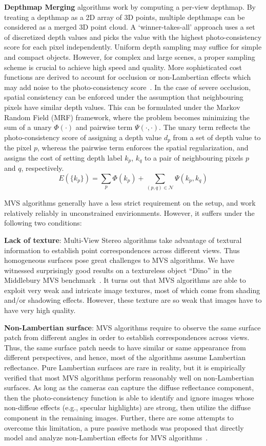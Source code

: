 \textbf{Depthmap Merging} algorithms work by computing a per-view depthmap. By treating a depthmap as a 2D array of 3D points, multiple depthmaps can be considered as a merged 3D point cloud. A `winner-takes-all' approach uses a set of discretized depth values and picks the value with the highest photo-consistency score for each pixel independently. Uniform depth sampling may suffice for simple and compact objects. However, for complex and large scenes, a proper sampling scheme is crucial to achieve high speed and quality. More sophisticated cost functions are derived to account for occlusion or non-Lambertian effects which may add noise to the photo-consistency score~\cite{goesele2006multi,vogiatzis2007multiview}. In the case of severe occlusion, spatial consistency can be enforced under the assumption that neighbouring pixels have similar depth values. This can be formulated under the Markov Random Field (MRF) framework, where the problem becomes minimizing the sum of a unary $\Phi(\cdot)$ and pairwise term $\Psi(\cdot, \cdot)$. The unary term reflects the photo-consistency score of assigning a depth value $d_p$ from a set of depth value to the pixel $p$, whereas the pairwise term enforces the spatial regularization, and assigns the cost of setting depth label $k_p$, $k_q$ to a pair of neighbouring pixels $p$ and $q$, respectively.
$$
E(\{k_p\})= \sum_p \Phi(k_p) + \sum_{(p,q)\in\mathcal{N}}\Psi(k_p, k_q)
$$

MVS algorithms generally have a less strict requirement on the setup, and work relatively reliably in unconstrained envirionments. However, it suffers under the following two conditions:

\textbf{Lack of texture}: Multi-View Stereo algorithms take advantage of textural information to establish point correspondences across different views. Thus homogeneous surfaces pose great challenges to MVS algorithms. We have witnessed surprisingly good results on a textureless object ``Dino'' in the Middlebury MVS benchmark~\cite{seitz2006comparison}. It turns out that MVS algorithms are able to exploit very weak and intricate image textures, most of which come from shading and/or shadowing effects. However, these texture are so weak that images have to have very high quality.

\textbf{Non-Lambertian surface}: MVS algorithms require to observe the same surface patch from different angles in order to establish correspondences across views. Thus, the same surface patch needs to have similar or same appearance from different perspectives, and hence, most of the algorithms assume Lambertian reflectance. Pure Lambertian surfaces are rare in reality, but it is empirically verified that most MVS algorithms perform reasonably well on non-Lambertian surfaces. As long as the cameras can capture the diffuse reflectance component, then the photo-consistency function is able to identify and ignore images whose non-diffsue effects (e.g., specular highlights) are strong, then utilize the diffuse component in the remaining images. Further, there are some attempts to overcome this limitation, a pure passive methods was proposed that directly model and analyze non-Lambertian effects for MVS algorithms~\cite{jin2003multi,jin2005multi}.

